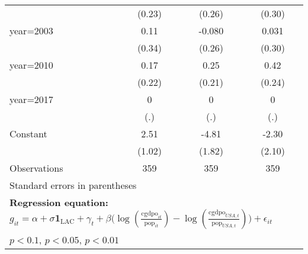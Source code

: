 \begin{sidewaystable}[htbp]
\begin{tabular}{l*{3}{c}}
                &   (0.23)         &   (0.26)         &   (0.30)         \\
\addlinespace
year=2003       &     0.11         &   -0.080         &    0.031         \\
                &   (0.34)         &   (0.26)         &   (0.30)         \\
\addlinespace
year=2010       &     0.17         &     0.25         &     0.42\sym{*}  \\
                &   (0.22)         &   (0.21)         &   (0.24)         \\
\addlinespace
year=2017       &        0         &        0         &        0         \\
                &      (.)         &      (.)         &      (.)         \\
\addlinespace
Constant        &     2.51\sym{**} &    -4.81\sym{**} &    -2.30         \\
                &   (1.02)         &   (1.82)         &   (2.10)         \\
\midrule
Observations    &      359         &      359         &      359         \\
\bottomrule
\multicolumn{4}{l}{\footnotesize Standard errors in parentheses}\\
\multicolumn{4}{l}{\footnotesize \textbf{Regression equation:} \(g_{it} = \alpha + \sigma \mathbf{1}_{\textrm{LAC}} + \gamma_t + \beta \big(\log (\frac{\textrm{cgdpo}_{it}}{\textrm{pop}_{it}} ) - \log (\frac{\textrm{cgdpo}_{USA,t}}{\textrm{pop}_{USA,t}}  ) \big) + \epsilon_{it}\)}\\
\multicolumn{4}{l}{\footnotesize \sym{*} \(p<0.1\), \sym{**} \(p<0.05\), \sym{***} \(p<0.01\)}\\
\end{tabular}
\end{sidewaystable}
